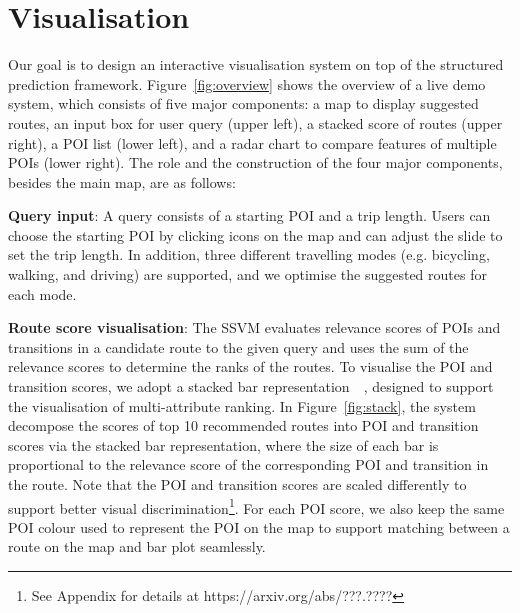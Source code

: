 \section{Visualisation}
Our goal is to design an interactive visualisation system on top of the structured prediction framework.
Figure~\ref{fig:overview} shows the overview of a live demo system, which consists of five major components: a map to display suggested routes, an input box for user query (upper left), a stacked score of routes (upper right), a POI list (lower left), and a radar chart to compare features of multiple POIs (lower right). 
The role and the construction of the four major components, besides the main map, are as follows:

\textbf{Query input}: A query consists of a starting POI and a trip length. 
Users can choose the starting POI by clicking icons on the map and can adjust the slide to set the trip length. 
In addition, three different travelling modes (e.g. bicycling, walking, and driving) are supported, 
and we optimise the suggested routes for each mode.

\textbf{Route score visualisation}: 
The SSVM evaluates relevance scores of POIs and transitions in a candidate route to the given query and uses the sum of the relevance scores to determine the ranks of the routes.
To visualise the POI and transition scores, we adopt a stacked bar representation~~\cite{gratzl2013lineup}, designed to support the visualisation of multi-attribute ranking.
In Figure~\ref{fig:stack}, the system decompose the scores of top 10 recommended routes into POI and transition scores via the stacked bar representation, where the size of each bar is proportional to the relevance score of the corresponding POI and transition in the route.
Note that the POI and transition scores are scaled differently to support better visual discrimination\footnote{See Appendix for details at https://arxiv.org/abs/???.????}.
For each POI score, we also keep the same POI colour used to represent the POI on the map to support matching between a route on the map and bar plot seamlessly.


